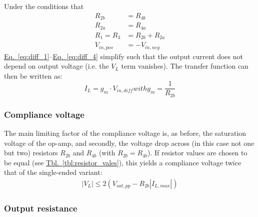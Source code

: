 \documentclass[10pt]{article}
\newcommand{\briefeqlink}[1]{\hyperref[#1]{Eq.~\ref*{#1}}\xspace }
\newcommand{\tablelink}[1]{\hyperref[#1]{Tbl.~\ref*{#1}}\xspace }
\begin{document}
Under the conditions that
\begin{subequations}
\label{eq:diff_howland_conditions}
\begin{align}
R_{2b} &= R_{4b}\\
R_{2a} &= R_{4a}\\
R_1 = R_3 &= R_{2b} + R_{2a}\\
V_{in,pos} &= -V_{in,neg}
\end{align}
\end{subequations}
\briefeqlink{eq:diff_1}--\briefeqlink{eq:diff_4} simplify such that the output current does not depend on output voltage (i.e. the $V_L$ term vanishes). The transfer function can then be written as:
\begin{subequations}
\label{eq:diff_gain}
\begin{equation}
I_L = g_m \cdot V_{in,diff}
\end{equation}
with
\begin{equation}
g_m = \frac{1}{R_{2b}}
\end{equation}
\end{subequations}


\subsubsection{Compliance voltage}

The main limiting factor of the compliance voltage is, as before, the saturation voltage of the op-amp, and secondly, the voltage drop across (in this case not one but two) resistors $R_{2b}$ and $R_{4b}$ (with $R_{2b}=R_{4b}$). If resistor values are chosen to be equal (see \tablelink{tbl:resistor_vales}), this yields a compliance voltage twice that of the single-ended variant:
\begin{align}
\label{eq:diff_compliance_voltage}
|V_L|\leq 2\left(V_{sat,pp} - R_{2b}|I_{L,max}|\right)
\end{align}


\subsubsection{Output resistance}
\label{sec:symmetrical_vccs_output_resistance}
\end{document}

